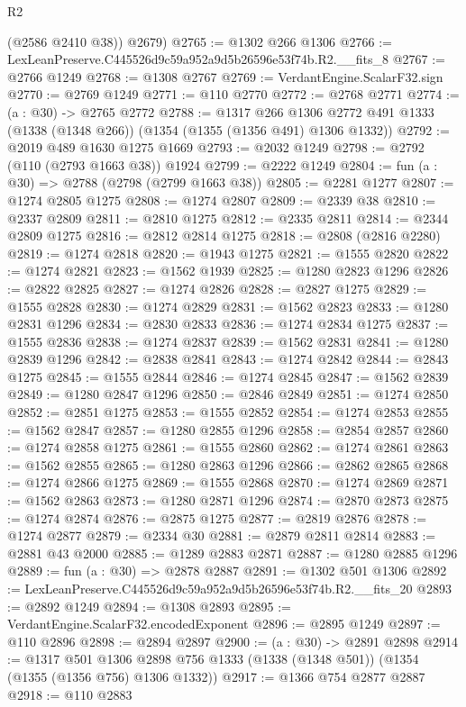 \begin{lexlean}{R2}
\begin{coremodule}
        (@2586 @2410 @38))
      @2679)
@2765 := @1302 @266 @1306
@2766 := LexLeanPreserve.C445526d9c59a952a9d5b26596e53f74b.R2.__fits_8
@2767 := @2766 @1249
@2768 := @1308 @2767
@2769 := VerdantEngine.ScalarF32.sign
@2770 := @2769 @1249
@2771 := @110 @2770
@2772 := @2768 @2771
@2774 := (a : @30) -> @2765 @2772
@2788 := @1317
    @266
    @1306
    @2772
    @491
    @1333
    (@1338 (@1348 @266))
    (@1354 (@1355 (@1356 @491) @1306 @1332))
@2792 := @2019 @489 @1630 @1275 @1669
@2793 := @2032 @1249
@2798 := @2792 (@110 (@2793 @1663 @38)) @1924
@2799 := @2222 @1249
@2804 := fun (a : @30) => @2788 (@2798 (@2799 @1663 @38))
@2805 := @2281 @1277
@2807 := @1274 @2805 @1275
@2808 := @1274 @2807
@2809 := @2339 @38
@2810 := @2337 @2809
@2811 := @2810 @1275
@2812 := @2335 @2811
@2814 := @2344 @2809 @1275
@2816 := @2812 @2814 @1275
@2818 := @2808 (@2816 @2280)
@2819 := @1274 @2818
@2820 := @1943 @1275
@2821 := @1555 @2820
@2822 := @1274 @2821
@2823 := @1562 @1939
@2825 := @1280 @2823 @1296
@2826 := @2822 @2825
@2827 := @1274 @2826
@2828 := @2827 @1275
@2829 := @1555 @2828
@2830 := @1274 @2829
@2831 := @1562 @2823
@2833 := @1280 @2831 @1296
@2834 := @2830 @2833
@2836 := @1274 @2834 @1275
@2837 := @1555 @2836
@2838 := @1274 @2837
@2839 := @1562 @2831
@2841 := @1280 @2839 @1296
@2842 := @2838 @2841
@2843 := @1274 @2842
@2844 := @2843 @1275
@2845 := @1555 @2844
@2846 := @1274 @2845
@2847 := @1562 @2839
@2849 := @1280 @2847 @1296
@2850 := @2846 @2849
@2851 := @1274 @2850
@2852 := @2851 @1275
@2853 := @1555 @2852
@2854 := @1274 @2853
@2855 := @1562 @2847
@2857 := @1280 @2855 @1296
@2858 := @2854 @2857
@2860 := @1274 @2858 @1275
@2861 := @1555 @2860
@2862 := @1274 @2861
@2863 := @1562 @2855
@2865 := @1280 @2863 @1296
@2866 := @2862 @2865
@2868 := @1274 @2866 @1275
@2869 := @1555 @2868
@2870 := @1274 @2869
@2871 := @1562 @2863
@2873 := @1280 @2871 @1296
@2874 := @2870 @2873
@2875 := @1274 @2874
@2876 := @2875 @1275
@2877 := @2819 @2876
@2878 := @1274 @2877
@2879 := @2334 @30
@2881 := @2879 @2811 @2814
@2883 := @2881 @43 @2000
@2885 := @1289 @2883 @2871
@2887 := @1280 @2885 @1296
@2889 := fun (a : @30) => @2878 @2887
@2891 := @1302 @501 @1306
@2892 := LexLeanPreserve.C445526d9c59a952a9d5b26596e53f74b.R2.__fits_20
@2893 := @2892 @1249
@2894 := @1308 @2893
@2895 := VerdantEngine.ScalarF32.encodedExponent
@2896 := @2895 @1249
@2897 := @110 @2896
@2898 := @2894 @2897
@2900 := (a : @30) -> @2891 @2898
@2914 := @1317
    @501
    @1306
    @2898
    @756
    @1333
    (@1338 (@1348 @501))
    (@1354 (@1355 (@1356 @756) @1306 @1332))
@2917 := @1366 @754 @2877 @2887
@2918 := @110 @2883

\end{coremodule}
\end{lexlean}
